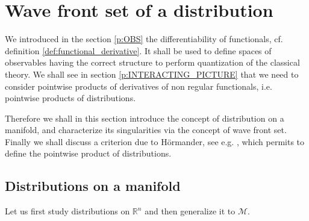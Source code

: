 \documentclass[11pt]{book}
\newcommand{\Mcal}{\mathcal{M}}
\newcommand{\Rbb}{\mathbb{R}}
\theoremstyle{break}
\begin{document}
\section{Wave front set of a distribution}


We introduced in the section \ref{p:OBS} the differentiability of functionals, cf. definition \ref{def:functional_derivative}. It shall be used to define spaces of observables having the correct structure to perform quantization of the classical theory. We shall see in section \ref{p:INTERACTING_PICTURE} that we need to consider pointwise products of derivatives of non regular functionals, i.e. pointwise products of distributions. 


Therefore we shall in this section introduce the concept of distribution on a manifold, and characterize its singularities via the concept of wave front set. Finally we shall discuss a criterion due to Hörmander, see e.g. \cite{hormander_analysis_1990}, which permits to define the pointwise product of distributions.


\subsection{Distributions on a manifold}
\label{p:DISTRIB}


Let us first study distributions on $\Rbb^n$ and then generalize it to $\Mcal$. 


\bigskip
\end{document}
